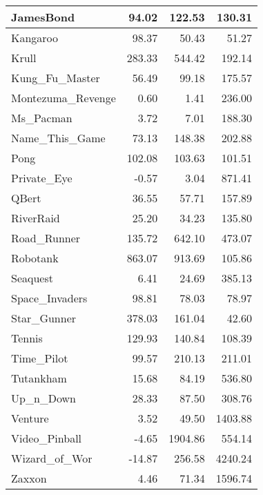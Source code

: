 \documentclass{article}
\begin{document}
\begin{table*}[h]
\begin{tabular}{l|r|r|r}
		\hline
		JamesBond & 94.02 & 122.53 & 130.31 \\
		\hline
		Kangaroo & 98.37 & 50.43 & 51.27 \\
		\hline
		Krull & 283.33 & 544.42 & 192.14 \\
		\hline
		Kung\_Fu\_Master & 56.49 & 99.18 & 175.57 \\
		\hline
		Montezuma\_Revenge & 0.60 & 1.41 & 236.00 \\
		\hline
		Ms\_Pacman & 3.72 & 7.01 & 188.30 \\
		\hline
		Name\_This\_Game & 73.13 & 148.38 & 202.88 \\
		\hline
		Pong & 102.08 & 103.63 & 101.51 \\
		\hline
		Private\_Eye & -0.57 & 3.04 & 871.41 \\
		\hline
		QBert & 36.55 & 57.71 & 157.89 \\
		\hline
		RiverRaid & 25.20 & 34.23 & 135.80 \\
		\hline
		Road\_Runner & 135.72 & 642.10 & 473.07 \\
		\hline
		Robotank & 863.07 & 913.69 & 105.86 \\
		\hline
		Seaquest & 6.41 & 24.69 & 385.13 \\
		\hline
		Space\_Invaders & 98.81 & 78.03 & 78.97 \\
		\hline
		Star\_Gunner & 378.03 & 161.04 & 42.60 \\
		\hline
		Tennis & 129.93 & 140.84 & 108.39 \\
		\hline
		Time\_Pilot & 99.57 & 210.13 & 211.01 \\
		\hline
		Tutankham & 15.68 & 84.19 & 536.80 \\
		\hline
		Up\_n\_Down & 28.33 & 87.50 & 308.76 \\
		\hline
		Venture & 3.52 & 49.50 & 1403.88 \\
		\hline
		Video\_Pinball & -4.65 & 1904.86 & 554.14 \\
		\hline
		Wizard\_of\_Wor & -14.87 & 256.58 & 4240.24 \\
		\hline
		Zaxxon & 4.46 & 71.34 & 1596.74 \\
		\hline
	\end{tabular}
\end{table*}
\end{document}

